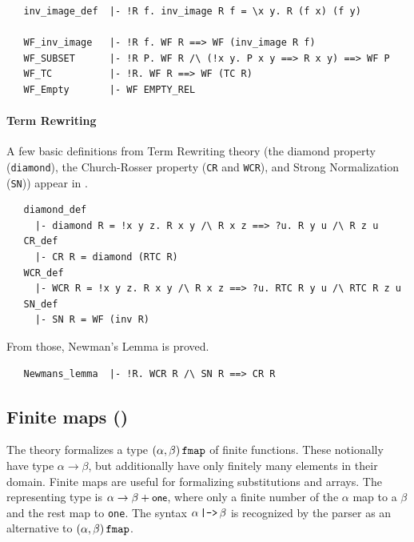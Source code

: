{\begin{hol}
\begin{verbatim}
   inv_image_def  |- !R f. inv_image R f = \x y. R (f x) (f y)

   WF_inv_image   |- !R f. WF R ==> WF (inv_image R f)
   WF_SUBSET      |- !R P. WF R /\ (!x y. P x y ==> R x y) ==> WF P
   WF_TC          |- !R. WF R ==> WF (TC R)
   WF_Empty       |- WF EMPTY_REL
\end{verbatim}
\end{hol}

\paragraph {Term Rewriting}

A few basic definitions from Term Rewriting theory
(the diamond property (\verb+diamond+), the Church-Rosser
property ({\small\verb+CR+} and {\small\verb+WCR+}), and Strong
Normalization ({\small\verb+SN+})) appear
in .
%
\begin{hol}
\begin{verbatim}
   diamond_def
     |- diamond R = !x y z. R x y /\ R x z ==> ?u. R y u /\ R z u
   CR_def
     |- CR R = diamond (RTC R)
   WCR_def
     |- WCR R = !x y z. R x y /\ R x z ==> ?u. RTC R y u /\ RTC R z u
   SN_def
     |- SN R = WF (inv R)
\end{verbatim}
\end{hol}
%
From those, Newman's Lemma is proved.
%
\begin{hol}
\begin{verbatim}
   Newmans_lemma  |- !R. WCR R /\ SN R ==> CR R
\end{verbatim}
\end{hol}

\subsection{Finite maps ()}
\label{sec:finite-map}

The theory  formalizes a type
$(\alpha,\beta)\,\holtxt{fmap}$ of finite functions. These notionally
have type $\alpha\to\beta$, but additionally have only finitely many
elements in their domain. Finite maps are useful for formalizing
substitutions and arrays. The representing type is $\alpha\to\beta +
\mbox{\small{\textbf{\sf{one}}}}$, where only a finite number of the $\alpha$ map to a
$\beta$ and the rest map to \verb+one+. The syntax
$\alpha\,\holtxt{|->}\,\beta$ is recognized by the parser as an
alternative to $(\alpha,\beta)\,\holtxt{fmap}$.

}
